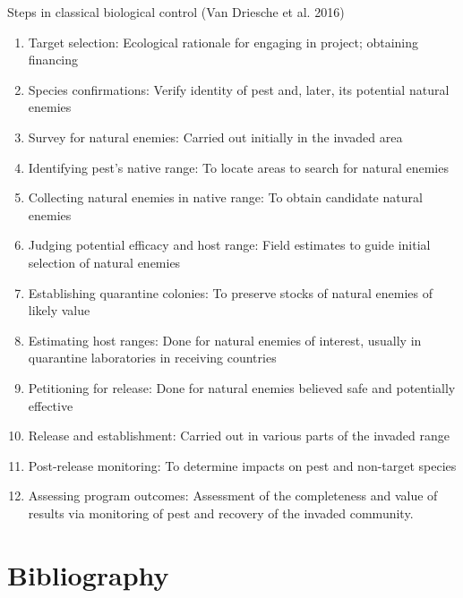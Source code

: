 \documentclass[11pt,dvipsnames,ignorenonframetext,aspectratio=169]{beamer}
\providecommand{\tightlist}{%
  \setlength{\itemsep}{0pt}\setlength{\parskip}{0pt}}
\begin{document}
\begin{frame}{Steps in classical biological control (Van Driesche et al.
2016)}
\protect\hypertarget{steps-in-classical-biological-control-van2016integrating}{}
\footnotesize

\begin{enumerate}
\tightlist
\item
  Target selection: Ecological rationale for engaging in project;
  obtaining financing
\item
  Species confirmations: Verify identity of pest and, later, its
  potential natural enemies
\item
  Survey for natural enemies: Carried out initially in the invaded area
\item
  Identifying pest's native range: To locate areas to search for natural
  enemies
\item
  Collecting natural enemies in native range: To obtain candidate
  natural enemies
\item
  Judging potential efficacy and host range: Field estimates to guide
  initial selection of natural enemies
\item
  Establishing quarantine colonies: To preserve stocks of natural
  enemies of likely value
\item
  Estimating host ranges: Done for natural enemies of interest, usually
  in quarantine laboratories in receiving countries
\item
  Petitioning for release: Done for natural enemies believed safe and
  potentially effective
\item
  Release and establishment: Carried out in various parts of the invaded
  range
\item
  Post-release monitoring: To determine impacts on pest and non-target
  species
\item
  Assessing program outcomes: Assessment of the completeness and value
  of results via monitoring of pest and recovery of the invaded
  community.
\end{enumerate}
\end{frame}

\hypertarget{bibliography}{%
\section{Bibliography}\label{bibliography}}
\end{document}
